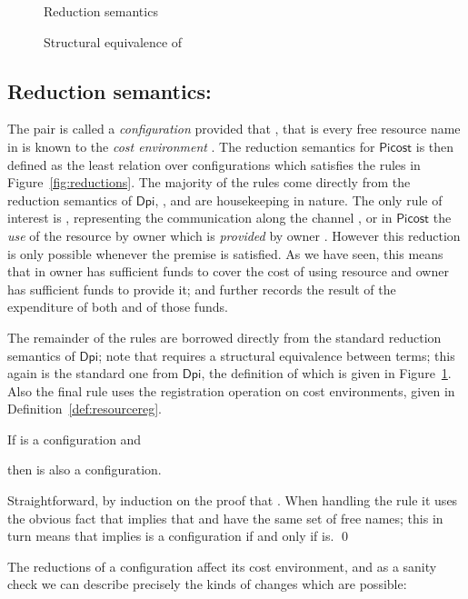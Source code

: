 \documentclass{LMCS}
\newcommand{\pfn}[1]{\mathsf{#1}}  \newcommand{\cfn}[1]{\mathsf{#1}}  \newcommand{\ownfnt}[1]{{\mathsf{#1}}}
\newcommand{\DPI}{\ensuremath{\pfn{Dpi}}\xspace}
\newcommand{\picost}{\ensuremath{\pfn{Picost}}\xspace}
\begin{document}
\begin{figure}[t]


\caption{Reduction semantics \label{fig:reductions}}


\caption{Structural equivalence of  \label{fig:structeq}}

\end{figure}


\subsection{Reduction semantics:}
The pair  is called a \emph{configuration} provided that
, that is every free
resource name in  is known to the \emph{cost environment} .
The reduction semantics for \picost is then defined as the least
relation over configurations which satisfies the rules in
Figure~\ref{fig:reductions}.  The majority of the rules come directly
from the reduction semantics of \DPI, \cite{dpibook}, and are
housekeeping in nature. The only rule of interest is ,
representing the communication along the channel , or in \picost
the \emph{use} of the resource  by owner  which is
\emph{provided} by owner . However this reduction is only possible
whenever the premise  is
satisfied.
As we have seen, this means that in  owner 
has sufficient funds to cover the cost of using resource  and owner
 has sufficient funds to provide it; and further  records
the result of the expenditure of both  and  of
those funds.


The remainder of the rules are borrowed directly from the standard
reduction semantics of \DPI; note that  requires a
structural equivalence between terms; this again is the standard one
from \DPI, the definition of which is given  in
Figure~\ref{fig:structeq}. Also the final rule  uses the
registration operation on cost environments, given in
Definition~\ref{def:resourcereg}.
\begin{prop}
  If  is a configuration and 
 
then  is also a configuration.  
\end{prop}
\proof
Straightforward, by induction on the proof that 
.
When handling the rule  it uses the obvious fact that 
implies that  and  have the same set of free names; this in turn means that
 implies  is a configuration if and only if
 is. 
\qed

The reductions of a configuration affect its cost environment, and
as a sanity check we can describe precisely the kinds of changes which
are possible:\vfill\eject
\end{document}

